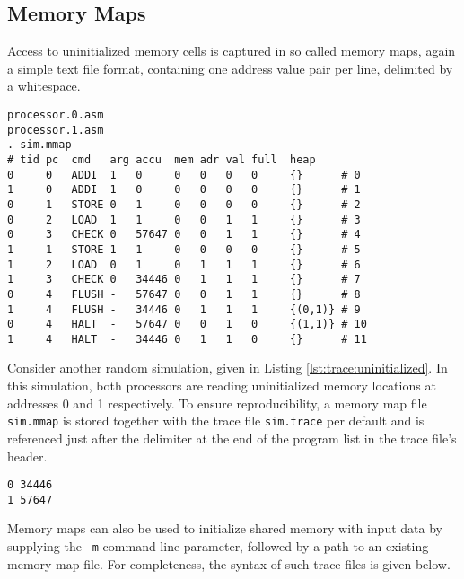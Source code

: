 \subsection{Memory Maps}

Access to uninitialized memory cells is captured in so called memory maps, again a simple text file format, containing one address value pair per line, delimited by a whitespace.

\begin{lstlisting}[language={[concubine]Assembler}, caption={Output Trace Accessing Uninitialized Memory}, label={lst:trace:uninitialized}, xleftmargin=\parindent]
processor.0.asm
processor.1.asm
. sim.mmap
# tid pc  cmd   arg accu  mem adr val full  heap
0     0   ADDI  1   0     0   0   0   0     {}      # 0
1     0   ADDI  1   0     0   0   0   0     {}      # 1
0     1   STORE 0   1     0   0   0   0     {}      # 2
0     2   LOAD  1   1     0   0   1   1     {}      # 3
0     3   CHECK 0   57647 0   0   1   1     {}      # 4
1     1   STORE 1   1     0   0   0   0     {}      # 5
1     2   LOAD  0   1     0   1   1   1     {}      # 6
1     3   CHECK 0   34446 0   1   1   1     {}      # 7
0     4   FLUSH -   57647 0   0   1   1     {}      # 8
1     4   FLUSH -   34446 0   1   1   1     {(0,1)} # 9
0     4   HALT  -   57647 0   0   1   0     {(1,1)} # 10
1     4   HALT  -   34446 0   1   1   0     {}      # 11
\end{lstlisting}

Consider another random simulation, given in Listing \ref{lst:trace:uninitialized}.
In this simulation, both processors are reading uninitialized memory locations at addresses 0 and 1 respectively.
To ensure reproducibility, a memory map file \texttt{sim.mmap} is stored together with the trace file \texttt{sim.trace} per default and is referenced just after the delimiter at the end of the program list in the trace file's header.

\begin{lstlisting}[language={[concubine]Assembler}, caption={Output Memory Map of the Trace in Listing \ref{lst:trace:uninitialized}}, label={lst:mmap:uninitialized}, xleftmargin=0.39\textwidth]
0 34446
1 57647
\end{lstlisting}

Memory maps can also be used to initialize shared memory with input data by supplying the \texttt{-m} command line parameter, followed by a path to an existing memory map file.
For completeness, the syntax of such trace files is given below.

